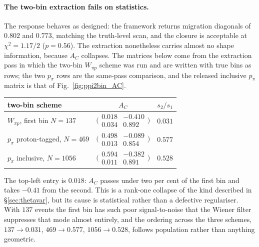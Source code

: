 \documentclass[11pt,a4paper]{article}
\begin{document}
\paragraph{The two-bin extraction fails on statistics.} The response behaves as designed:
the framework returns migration diagonals of $0.802$ and $0.773$, matching the truth-level
scan, and the closure is acceptable at $\chi^2=1.17/2$ ($p=0.56$). The extraction
nonetheless carries almost no shape information, because $A_C$ collapses. The matrices
below come from the extraction pass in which the two-bin $W_{\pi p}$ scheme was run and are
written with true bins as rows; the two $p_\pi$ rows are the same-pass comparison, and the
released inclusive $p_\pi$ matrix is that of Fig.~\ref{fig:ppi2bin_AC}.
\begin{center}\small
\begin{tabular}{lcc}
\toprule
two-bin scheme & $A_C$ & $s_2/s_1$ \\\midrule
$W_{\pi p}$, first bin $N=137$      & $\bigl(\begin{smallmatrix} 0.018 & -0.410 \\ 0.034 & 0.892\end{smallmatrix}\bigr)$ & $\mathbf{0.031}$ \\
$p_\pi$ proton-tagged, $N=469$      & $\bigl(\begin{smallmatrix} 0.498 & -0.089 \\ 0.013 & 0.854\end{smallmatrix}\bigr)$ & $0.577$ \\
$p_\pi$ inclusive, $N=1056$         & $\bigl(\begin{smallmatrix} 0.594 & -0.382 \\ 0.011 & 0.891\end{smallmatrix}\bigr)$ & $0.528$ \\
\bottomrule
\end{tabular}
\end{center}

\noindent The top-left entry is $0.018$: $A_C$ passes under two per cent of the first bin and
takes $-0.41$ from the second. This is a rank-one collapse of the kind described in
\S\ref{sec:thetavar}, but its cause is statistical rather than a defective regulariser. With
$137$ events the first bin has such poor signal-to-noise that the Wiener filter suppresses
that mode almost entirely, and the ordering across the three schemes, $137\to0.031$,
$469\to0.577$, $1056\to0.528$, follows population rather than anything geometric.
\end{document}
